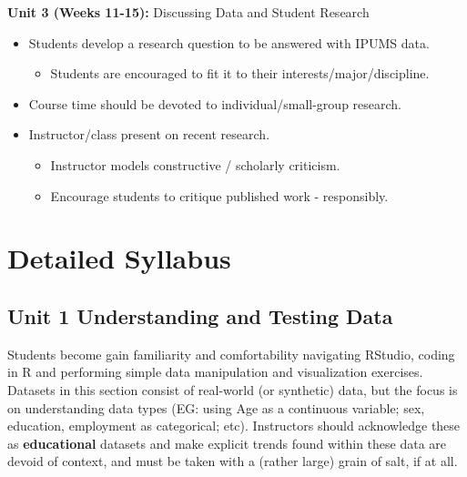 \documentclass[
]{book}
\providecommand{\tightlist}{%
  \setlength{\itemsep}{0pt}\setlength{\parskip}{0pt}}
\begin{document}
\textbf{Unit 3 (Weeks 11-15):} Discussing Data and Student Research

\begin{itemize}
\tightlist
\item
  Students develop a research question to be answered with IPUMS data.

  \begin{itemize}
  \tightlist
  \item
    Students are encouraged to fit it to their interests/major/discipline.
  \end{itemize}
\item
  Course time should be devoted to individual/small-group research.
\item
  Instructor/class present on recent research.

  \begin{itemize}
  \tightlist
  \item
    Instructor models constructive / scholarly criticism.
  \item
    Encourage students to critique published work - responsibly.
  \end{itemize}
\end{itemize}

\hypertarget{detailed-syllabus}{%
\section*{Detailed Syllabus}\label{detailed-syllabus}}

\hypertarget{unit-1-understanding-and-testing-data}{%
\subsection*{Unit 1 Understanding and Testing Data}\label{unit-1-understanding-and-testing-data}}

Students become gain familiarity and comfortability navigating RStudio, coding in R and performing simple data manipulation and visualization exercises. Datasets in this section consist of real-world (or synthetic) data, but the focus is on understanding data types (EG: using Age as a continuous variable; sex, education, employment as categorical; etc). Instructors should acknowledge these as \textbf{educational} datasets and make explicit trends found within these data are devoid of context, and must be taken with a (rather large) grain of salt, if at all.
\end{document}
